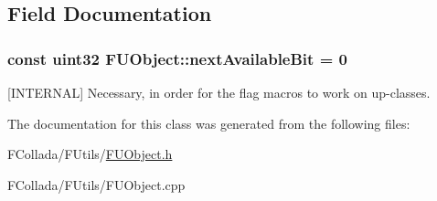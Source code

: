 \subsection{Field Documentation}
\hypertarget{classFUObject_a1fe08ae8277bc677dc3339fcc4c03252}{
\subsubsection[{nextAvailableBit}]{\setlength{\rightskip}{0pt plus 5cm}const uint32 {\bf FUObject::nextAvailableBit} = 0}}
\label{classFUObject_a1fe08ae8277bc677dc3339fcc4c03252}
\mbox{[}INTERNAL\mbox{]} Necessary, in order for the flag macros to work on up-\/classes. 

The documentation for this class was generated from the following files:\begin{DoxyCompactItemize}
\item 
FCollada/FUtils/\hyperlink{FUObject_8h}{FUObject.h}\item 
FCollada/FUtils/FUObject.cpp\end{DoxyCompactItemize}
